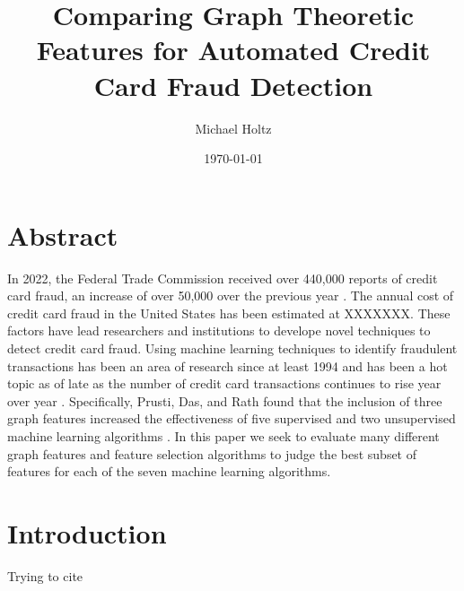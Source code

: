 \documentclass{article}
\title{Comparing Graph Theoretic Features for Automated Credit Card Fraud Detection}
\author{Michael Holtz}
\date{\today}
\begin{document}
\maketitle

\section{Abstract}
In 2022, the Federal Trade Commission received over 440,000 reports of credit card fraud, an increase of over 50,000 over the previous year \cite{ftc2021,ftc2022}. The annual cost of credit card fraud in the United States has been estimated at XXXXXXX. These factors have lead researchers and institutions to develope novel techniques to detect credit card fraud. Using machine learning techniques to identify fraudulent transactions has been an area of research since at least 1994 and has been a hot topic as of late as the number of credit card transactions continues to rise year over year \cite{1994, Federal_Reserve_2023}. Specifically, Prusti, Das, and Rath found that the inclusion of three graph features increased the effectiveness of five supervised and two unsupervised machine learning algorithms \cite{graphdb}. In this paper we seek to evaluate many different graph features and feature selection algorithms to judge the best subset of features for each of the seven machine learning algorithms. 
\section{Introduction}
Trying to cite \cite{graphdb} \cite{Banksim}




\end{document}
